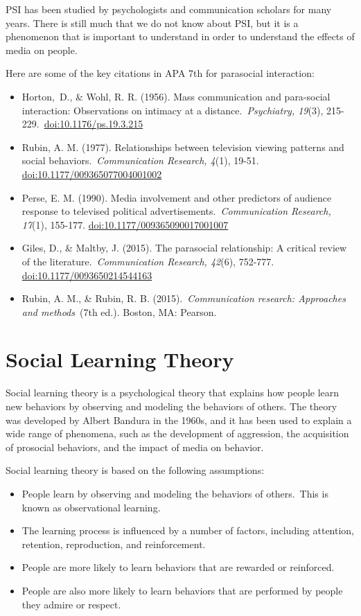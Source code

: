 \documentclass[
  b5paper]{book}
\begin{document}
PSI has been studied by psychologists and communication scholars for many years. There is still much that we do not know about PSI, but it is a phenomenon that is important to understand in order to understand the effects of media on people.

Here are some of the key citations in APA 7th for parasocial interaction:

\begin{itemize}
\item
  Horton,~D., \& Wohl, R. R. (1956). Mass communication and para-social interaction: Observations on intimacy at a distance.~\emph{Psychiatry, 19}(3), 215-229.~\url{doi:10.1176/ps.19.3.215}
\item
  Rubin, A. M. (1977). Relationships between television viewing patterns and social behaviors.~\emph{Communication Research, 4}(1), 19-51. \url{doi:10.1177/009365077004001002}
\item
  Perse, E. M. (1990). Media involvement and other predictors of audience response to televised political advertisements.~\emph{Communication Research, 17}(1), 155-177. \url{doi:10.1177/009365090017001007}
\item
  Giles, D., \& Maltby, J. (2015). The parasocial relationship: A critical review of the literature.~\emph{Communication Research, 42}(6), 752-777. \url{doi:10.1177/0093650214544163}
\item
  Rubin, A. M., \& Rubin, R. B. (2015).~\emph{Communication research: Approaches and methods}~(7th ed.). Boston, MA: Pearson.
\end{itemize}

\hypertarget{social-learning-theory}{%
\section{Social Learning Theory}\label{social-learning-theory}}

Social learning theory is a psychological theory that explains how people learn new behaviors by observing and modeling the behaviors of others. The theory was developed by Albert Bandura in the 1960s, and it has been used to explain a wide range of phenomena, such as the development of aggression, the acquisition of prosocial behaviors, and the impact of media on behavior.

Social learning theory is based on the following assumptions:

\begin{itemize}
\item
  People learn by observing and modeling the behaviors of others.~This is known as observational learning.
\item
  The learning process is influenced by a number of factors, including attention, retention, reproduction, and reinforcement.
\item
  People are more likely to learn behaviors that are rewarded or reinforced.
\item
  People are also more likely to learn behaviors that are performed by people they admire or respect.
\end{itemize}
\end{document}
